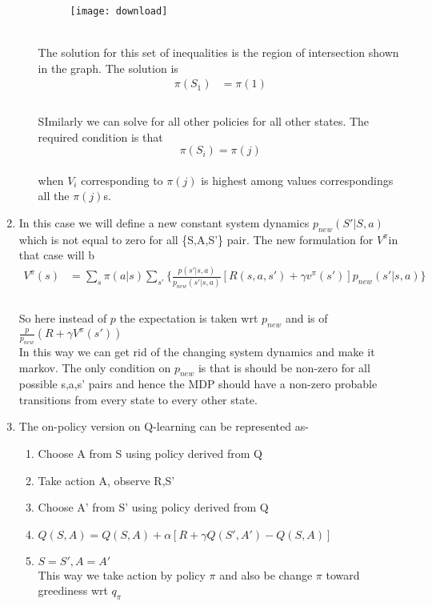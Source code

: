 \documentclass[english]{article}
\begin{document}
\begin{enumerate}
\begin{enumerate}
\begin{figure}[H]
\texttt{[image: download]}
\end{figure}
\\
The solution for this set of inequalities is the region of intersection
shown in the graph. The solution is
\begin{align}
\pi(S_{1}) & =\pi(1)\label{-5<a<0;1>gamma>-a/5}\\
\label{10>a>0;1-(a/10)>gamma>0}
\end{align}
\\
SImilarly we can solve for all other policies for all other states.
The required condition is that
\[
\pi(S_{i})=\pi(j)
\]
\\
when $V_{i}$ corresponding to $\pi(j)$ is highest among values correspondings
all the $\pi(j)$s.
\end{enumerate}
\item In this case we will define a new constant system dynamics $p_{new}(S'|S,a)$
which is not equal to zero for all \{S,A,S'\} pair. The new formulation
for $V^{\pi}$in that case will b\linebreak{}
\begin{align*}
V^{\pi}(s) & =\sum_{s}\pi(a|s)\sum_{s'}\{\frac{p(s'|s,a)}{p_{new}(s'|s,a)}[R(s,a,s')+\gamma v^{\pi}(s')]p_{new}(s'|s,a)\}\\
\end{align*}
\\
So here instead of $p$ the expectation is taken wrt $p_{new}$ and
is of $\frac{p}{p_{new}}(R+\gamma V^{\pi}(s'))$\\
In this way we can get rid of the changing system dynamics and make
it markov. The only condition on $p_{new}$ is that is should be non-zero
for all possible s,a,s' pairs and hence the MDP should have a non-zero
probable transitions from every state to every other state.
\item The on-policy version on Q-learning can be represented as-\\
\begin{enumerate}
\item Choose A from S using policy derived from Q
\item Take action A, observe R,S'
\item Choose A' from S' using policy derived from Q
\item $Q(S,A)=Q(S,A)+\alpha[R+\gamma Q(S',A')-Q(S,A)]$
\item $S=S',A=A'$\\
This way we take action by policy $\pi$ and also be change $\pi$
toward greediness wrt $q_{\pi}$\\

\end{enumerate}
\end{enumerate}
\end{document}
